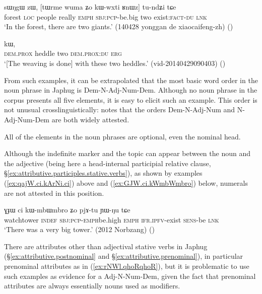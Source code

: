 \begin{exe}
\ex \label{ex:N.Adj.Num}
 \gll sɯŋgɯ zɯ, [tɯrme wuma ʑo kɯ-wxti ʁnɯz] tu-ndʑi tɕe\\
 forest \textsc{loc} people really \textsc{emph} \textsc{sbj}:\textsc{pcp}-be.big two exist:\textsc{fact}-\textsc{du} \textsc{lnk}\\
 \glt `In the forest, there are two giants.' (140428 yonggan de xiaocaifeng-zh)
()
\end{exe}

\begin{exe}
\ex \label{ex:Dem.N.Num.Dem}
  kɯ, \\
 \textsc{dem}.\textsc{prox} heddle two \textsc{dem}.\textsc{prox}:\textsc{du} \textsc{erg} \\
 \glt `[The weaving is done] with these two heddles.' (vid-20140429090403)
()
\end{exe}

From such examples, it can be extrapolated that the most basic word order in the noun phrase in Japhug is Dem-N-Adj-Num-Dem. Although no noun phrase in the corpus presents all five elements, it is easy to elicit such an example. This order is not unusual crosslinguistically: \citet{cinque05universal20} notes that the orders  Dem-N-Adj-Num and N-Adj-Num-Dem are both widely attested.

All of the elements in the noun phrases are optional, even the nominal head.

Although the indefinite marker  and the topic  can appear between the noun and the adjective (being here a head-internal participial relative clause, §\ref{ex:attributive.participles.stative.verbs}), as shown by examples (\ref{ex:qajW.ci.kArNi.ci}) above and (\ref{ex:GJW.ci.kWmbWmbro}) below, numerals are not attested in this position.

\begin{exe}
\ex \label{ex:GJW.ci.kWmbWmbro}
 \gll ɣɟɯ ci kɯ-mbɯ\redp{}mbro ʑo pjɤ-tu ɲɯ-ŋu tɕe   \\
 watchtower \textsc{indef} \textsc{sbj}:\textsc{pcp}-\textsc{emph}\redp{}be.high \textsc{emph} \textsc{ifr}.\textsc{ipfv}-exist \textsc{sens}-be \textsc{lnk} \\
\glt  `There was a very big tower.' (2012 Norbzang) 	()
\end{exe}

There are attributes other than adjectival stative verbs in Japhug (§\ref{ex:attributive.postnominal} and §\ref{ex:attributive.prenominal}), in particular prenominal attributes as  in (\ref{ex:rNWl.qhoRqhoR}), but it is problematic to use such examples as evidence for a Adj-N-Num-Dem, given the fact that prenominal attributes are always essentially nouns used as modifiers.

